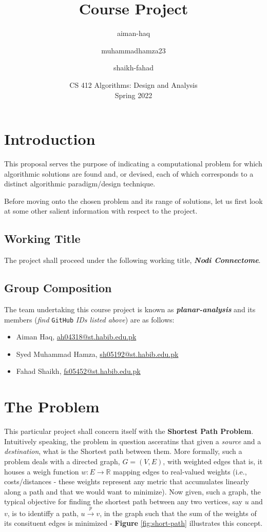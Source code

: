 \documentclass[a4paper]{article}
\title{Course Project}
\author{aiman-haq \and muhammadhamza23 \and shaikh-fahad}
\date{CS 412 Algorithms: Design and Analysis\\Spring 2022}
\begin{document}
\maketitle

\section{Introduction}
This proposal serves the purpose of indicating a computational problem for which algorithmic solutions are found and, or devised, each of which corresponds to a distinct algorithmic paradigm/design technique.

\noindent
Before moving onto the chosen problem and its range of solutions, let us first look at some other salient information with respect to the project.

\subsection{Working Title}
The project shall proceed under the following working title, \emph{\textbf{Nodi Connectome}}.

\subsection{Group Composition}
The team undertaking this course project is known as \emph{\textbf{planar-analysis}} and its members (\textit{find} \texttt{GitHub} \textit{IDs listed above}) are as follows:
\begin{itemize}
    \item Aiman Haq, \href{mailto:ah04318@st.habib.edu.pk}{ah04318@st.habib.edu.pk}
    \item Syed Muhammad Hamza, \href{mailto:sh05192@st.habib.edu.pk}{sh05192@st.habib.edu.pk}
    \item Fahad Shaikh, \href{mailto:fs05452@st.habib.edu.pk}{fs05452@st.habib.edu.pk}
\end{itemize}

\section{The Problem}
This particular project shall concern itself with the \textbf{Shortest Path Problem}. Intuitively speaking, the problem in question asceratins that given a \emph{source} and a \emph{destination}, what is the Shortest path between them. More formally, such a problem deals with a directed graph,
$G = (V, E)$, with weighted edges that is, it houses a weigh function $w: E \rightarrow \mathbb{R}$ mapping edges to real-valued weights (i.e., costs/distances - these weights represent any metric that accumulates linearly along a path and that we would want to minimize). Now given, such a graph,
the typical objective for finding the shortest path between any two vertices, say $u$ and $v$, is to identiffy a path, $u \xrightarrow{p} v$, in the graph such that the sum of the weights of its consituent edges is minimized \cite{cormenBk,open-dsa,chumbley}- \textbf{Figure} \ref{fig:short-path} illustrates this concept.
\end{document}
